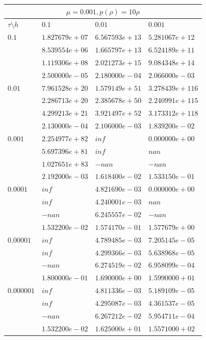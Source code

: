 \documentclass[12pt,a4paper]{article}
\begin{document}
\begin{tabular}{ |l|l|l|l| }
    \hline
    \multicolumn{4}{|c|}{$\mu = 0.001, p(\rho)  = 10\rho$}\\
    \hline
    $\tau\setminus h$ & $0.1$ & $0.01$ & $0.001$ \\
    \hline
    $0.1$ & $1.827679e+07$ & $6.567593e+13$ & $5.281067e+12$ \\
    & $8.539554e+06$ & $1.665797e+13$ & $6.524189e+11$ \\
    & $1.119306e+08$ & $2.021273e+15$ & $9.084348e+14$ \\
    & $2.500000e-05$ & $2.180000e-04$ & $2.066000e-03$ \\
    \hline
    $0.01$ & $7.961528e+20$ & $1.579149e+51$ & $3.278439e+116$ \\
    & $2.286713e+20$ & $2.385678e+50$ & $2.240991e+115$ \\
    & $4.299213e+21$ & $3.921497e+52$ & $3.173312e+118$ \\
    & $2.130000e-04$ & $2.106000e-03$ & $1.839200e-02$ \\
    \hline
    $0.001$ & $2.254977e+82$ & $inf$ & $0.000000e+00$ \\
    & $5.697396e+81$ & $inf$ & $nan$ \\
    & $1.027651e+83$ & $-nan$ & $-nan$ \\
    & $2.192000e-03$ & $1.618400e-02$ & $1.533150e-01$ \\
    \hline
    $0.0001$ & $inf$ & $4.821690e-03$ & $0.000000e+00$ \\
    & $inf$ & $4.240001e-03$ & $nan$ \\
    & $-nan$ & $6.245557e-02$ & $-nan$ \\
    & $1.532200e-02$ & $1.574170e-01$ & $1.577679e+00$ \\
    \hline
    $0.00001$ & $inf$ & $4.789485e-03$ & $7.205145e-05$ \\
    & $inf$ & $4.299366e-03$ & $5.638968e-05$ \\
    & $-nan$ & $6.274519e-02$ & $6.958099e-04$ \\
    & $1.800000e-01$ & $1.690000e+00$ & $1.5990000+01$ \\
    \hline
    $0.000001$ & $inf$ & $4.811336e-03$ & $5.189109e-05$ \\
    & $inf$ & $4.295087e-03$ & $4.361537e-05$ \\
    & $-nan$ & $6.267212e-02$ & $5.954711e-04$ \\
    & $1.532200e-02$ & $1.625000e+01$ & $1.5571000+02$ \\
    \hline
\end{tabular}
\end{document}
